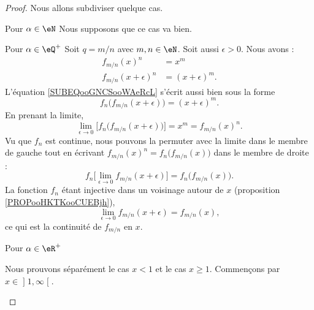 \begin{proof}
    Nous allons subdiviser quelque cas.
    \begin{subproof}
        \item[Pour \( \alpha\in \eN\)]
            Nous supposons que ce cas va bien.
        \item[Pour \( \alpha\in \eQ^+\)]
            Soit \( q=m/n\) avec \( m,n\in \eN\). Soit aussi \( \epsilon>0\). Nous avons :
            \begin{subequations}
                \begin{align}
                    f_{m/n}(x)^n&=x^m\\
                    f_{m/n}(x+\epsilon)^n&=(x+\epsilon)^m.      \label{SUBEQooGNCSooWAeRcL}
                \end{align}
            \end{subequations}
            L'équation \eqref{SUBEQooGNCSooWAeRcL} s'écrit aussi bien sous la forme
            \begin{equation}
                f_n\big( f_{m/n}(x+\epsilon) \big)=(x+\epsilon)^m.
            \end{equation}
            En prenant la limite,
            \begin{equation}
                \lim_{\epsilon\to 0}\big[ f_n\big( f_{m/n}(x+\epsilon) \big) \big]=x^m=f_{m/n}(x)^n.
            \end{equation}
            Vu que \( f_n\) est continue, nous pouvons la permuter avec la limite dans le membre de gauche tout en écrivant \( f_{m/n}(x)^n=f_n\big( f_{m/n}(x) \big)\) dans le membre de droite :
            \begin{equation}
                f_n\big[ \lim_{\epsilon\to 0}f_{m/n}(x+\epsilon) \big]=f_n\big( f_{m/n}(x) \big).
            \end{equation}
            La fonction \( f_n\) étant injective dans un voisinage autour de \( x\) (proposition \ref{PROPooHKTKooCUEBjh}),
            \begin{equation}
                \lim_{\epsilon\to 0}f_{m/n}(x+\epsilon)=f_{m/n}(x),
            \end{equation}
            ce qui est la continuité de \( f_{m/n}\) en \( x\).

        \item[Pour \( \alpha\in \eR^+\)]

        Nous prouvons séparément le cas \( x<1\) et le cas \( x\geq 1\). Commençons par \( x\in \mathopen] 1 , \infty \mathclose[\).


\end{subproof}
\end{proof}

